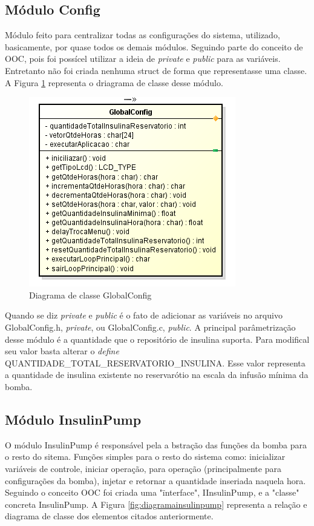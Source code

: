 \subsection{Módulo Config}

Módulo feito para centralizar todas as configurações do sistema, utilizado, basicamente, por quase todos os demais módulos. Seguindo parte do conceito de OOC, pois foi possícel utilizar a ideia de \emph{private} e \emph{public} para as variáveis. Entretanto não foi criada nenhuma struct de forma que representasse uma classe. A Figura \ref{fig:driagramaclasseconfig} representa o driagrama de classe desse módulo. \newpage


\begin{figure}[htp]
	\centering
	\includegraphics[scale=1]{images/classe_GlobalConfig.png}
	\caption{Diagrama de classe GlobalConfig}	
	\label{fig:driagramaclasseconfig}
\end{figure}

Quando se diz \emph{private} e \emph{public} é o fato de adicionar as variáveis no arquivo GlobalConfig.h, \emph{private}, ou GlobalConfig.c, \emph{public}. A principal parâmetrização desse módulo é a quantidade que o repositório de insulina suporta. Para modifical seu valor basta alterar o \emph{define} QUANTIDADE\_TOTAL\_RESERVATORIO\_INSULINA. Esse valor representa a quantidade de insulina existente no reservarótio na escala da infusão mínima da bomba.

\subsection{Módulo InsulinPump}

O módulo InsulinPump é responsável pela a bstração das funções da bomba para o resto do sitema. Funções simples para o resto do sistema como: inicializar variáveis de controle, iniciar operação, para operação (principalmente para configurações da bomba), injetar e retornar a quantidade inseriada naquela hora. Seguindo o conceito OOC foi criada uma "ïnterface", IInsulinPump, e a "classe" concreta InsulinPump. A Figura \ref{fig:diagramainsulinpump} representa a relação e diagrama de classe dos elementos citados anteriormente.

